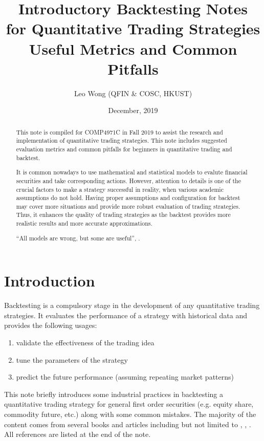 \documentclass[12pt]{article}
\title{Introductory Backtesting Notes \\ for Quantitative Trading Strategies \\[2ex]
  \large Useful Metrics and Common Pitfalls}
\author{Leo Wong (QFIN \& COSC, HKUST)}
\date{December, 2019}
\begin{document}
\begin{titlingpage}
  \maketitle
  \begin{abstract}
    This note is compiled for COMP4971C in Fall 2019 to assist the research and implementation of quantitative trading strategies. This note includes suggested evaluation metrics and common pitfalls for beginners in quantitative trading and backtest.

    It is common nowadays to use mathematical and statistical models to evalute financial securities and take corresponding actions. However, attention to details is one of the crucial factors to make a strategy successful in reality, when various academic assumptions do not hold. Having proper assumptions and configuration for backtest may cover more situations and provide more robust evaluation of trading strategies. Thus, it enhances the quality of trading strategies as the backtest provides more realistic results and more accurate approximations.

    \enquote{All models are wrong, but some are useful}, \cite{allmodelsarewrong}.
  \end{abstract}
\end{titlingpage}


\tableofcontents

\section{Introduction}

Backtesting is a compulsory stage in the development of any quantitative trading strategies. It evaluates the performance of a strategy with historical data and provides the following usages:

\begin{enumerate}
  \item validate the effectiveness of the trading idea
  \item tune the parameters of the strategy
  \item predict the future performance (assuming repeating market patterns)
\end{enumerate}

This note briefly introduces some industrial practices in backtesting a quantitative trading strategy for general first order securities (e.g. equity share, commodity future, etc.) along with some common mistakes. The majority of the content comes from several books and articles including but not limited to \cite{insideblackbox}, \cite{succalgotrading}, \cite{epchan2008}. All references are listed at the end of the note.
\end{document}
